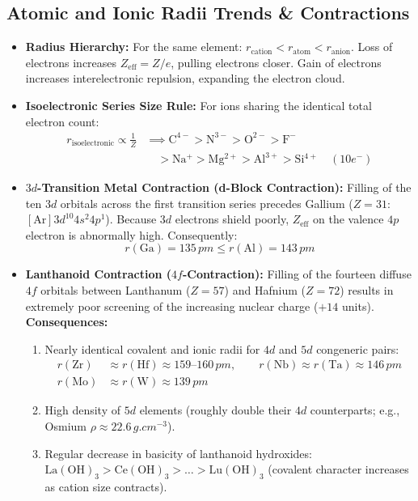 \documentclass[10pt,twoside,openright]{book}
\begin{document}
\subsection{Atomic and Ionic Radii Trends \& Contractions}
\begin{itemize}
  \item \textbf{Radius Hierarchy:} For the same element: $r_{\text{cation}} < r_{\text{atom}} < r_{\text{anion}}$.
  Loss of electrons increases $Z_{\text{eff}} = Z/e$, pulling electrons closer. Gain of electrons increases interelectronic repulsion, expanding the electron cloud.
  \item \textbf{Isoelectronic Series Size Rule:} For ions sharing the identical total electron count:
  \begin{align}
    r_{\text{isoelectronic}} \propto \frac{1}{Z} &\implies \mathrm{C^{4-} > N^{3-} > O^{2-} > F^-} \\
    &\quad > \mathrm{Na^+ > Mg^{2+} > Al^{3+} > Si^{4+}} \quad (10e^-)
  \end{align}
  \item \textbf{$3d$-Transition Metal Contraction (d-Block Contraction):}
  Filling of the ten $3d$ orbitals across the first transition series precedes Gallium ($Z=31$: $[\mathrm{Ar}] 3d^{10} 4s^2 4p^1$). Because $3d$ electrons shield poorly, $Z_{\text{eff}}$ on the valence $4p$ electron is abnormally high. Consequently:
  \begin{equation}
    r(\mathrm{Ga}) = 135\,\si{pm} \le r(\mathrm{Al}) = 143\,\si{pm}
  \end{equation}
  \item \textbf{Lanthanoid Contraction ($4f$-Contraction):}
  Filling of the fourteen diffuse $4f$ orbitals between Lanthanum ($Z=57$) and Hafnium ($Z=72$) results in extremely poor screening of the increasing nuclear charge ($+14$ units).
  \textbf{Consequences:}
  \begin{enumerate}
    \item Nearly identical covalent and ionic radii for $4d$ and $5d$ congeneric pairs:
    \begin{align}
      r(\mathrm{Zr}) &\approx r(\mathrm{Hf}) \approx 159\text{--}160\,\si{pm}, \qquad r(\mathrm{Nb}) \approx r(\mathrm{Ta}) \approx 146\,\si{pm} \\
      r(\mathrm{Mo}) &\approx r(\mathrm{W}) \approx 139\,\si{pm}
    \end{align}
    \item High density of $5d$ elements (roughly double their $4d$ counterparts; e.g., Osmium $\rho \approx 22.6\,\si{g.cm^{-3}}$).
    \item Regular decrease in basicity of lanthanoid hydroxides:
    $\mathrm{La(OH)_3} > \mathrm{Ce(OH)_3} > \dots > \mathrm{Lu(OH)_3}$ (covalent character increases as cation size contracts).
  \end{enumerate}
\end{itemize}
\end{document}
